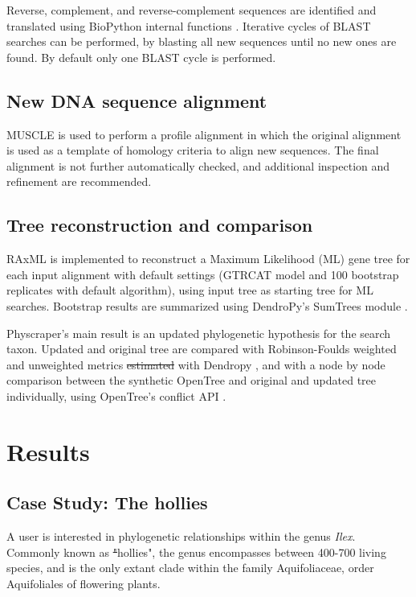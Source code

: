 \documentclass{bmcart}
\providecommand{\DIFaddtex}[1]{{\protect\color{blue}\uwave{#1}}} %
\providecommand{\DIFdeltex}[1]{{\protect\color{red}\sout{#1}}}                      %
\providecommand{\DIFaddbegin}{} %
\providecommand{\DIFaddend}{} %
\providecommand{\DIFdelbegin}{} %
\providecommand{\DIFdelend}{} %
\providecommand{\DIFadd}[1]{\texorpdfstring{\DIFaddtex{#1}}{#1}} %
\providecommand{\DIFdel}[1]{\texorpdfstring{\DIFdeltex{#1}}{}} %
\begin{document}
Reverse, complement, and reverse-complement sequences are identified and translated
using BioPython internal functions \cite{cock2009biopython}.
Iterative cycles of BLAST searches can be performed, by blasting all new sequences
until no new ones are found. By default only one BLAST cycle is performed.

\subsection*{New DNA sequence alignment}

MUSCLE \cite{edgar2004muscle} is used to perform a profile alignment in which the
original alignment is used as a template of homology criteria to align new sequences.
The final alignment is not further automatically checked, and additional inspection
and refinement are recommended.

\subsection*{Tree reconstruction and comparison}

RAxML \cite{stamatakis2014raxml} is implemented to reconstruct a Maximum Likelihood
(ML) gene tree for each input alignment with default settings (GTRCAT model and
100 bootstrap replicates with default algorithm), using input tree as starting
tree for ML searches.
Bootstrap results are summarized using DendroPy's SumTrees module
\cite{sukumaran2010dendropy}.

Physcraper's main result is an updated phylogenetic hypothesis for the search taxon.
Updated and original tree are compared with Robinson-Foulds weighted and unweighted
metrics \DIFdelbegin \DIFdel{estimated }\DIFdelend \DIFaddbegin \DIFadd{calculated }\DIFaddend with Dendropy \cite{sukumaran2010dendropy}, and with a node by node
comparison between the synthetic OpenTree and original and updated tree individually,
using OpenTree's conflict API \cite{redelings2017supertree}.


\section*{Results}
\subsection*{Case Study: The hollies}

A user is interested in phylogenetic relationships within the genus \textit{Ilex}. Commonly
known as \DIFdelbegin \DIFdel{"}\DIFdelend \DIFaddbegin \DIFadd{``}\DIFaddend hollies", the genus encompasses between 400-700 living species, and is
the only extant clade within the family Aquifoliaceae, order Aquifoliales of flowering
plants.
\end{document}
